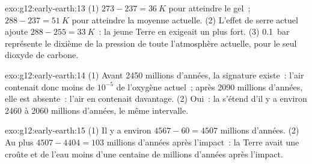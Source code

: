 \begin{solution}{exo:g12:early-earth:13}
(1) $273 - 237 = \qty{36}{K}$ pour atteindre le gel~; $288 - 237 = \qty{51}{K}$ pour
atteindre la moyenne actuelle. (2) L'effet de serre actuel ajoute $288 - 255 =
\qty{33}{K}$~: la jeune Terre en exigeait un plus fort. (3) \qty{0.1}{bar}
représente le dixième de la pression de toute l'atmosphère actuelle, pour
le seul dioxyde de carbone.
\end{solution}

\begin{solution}{exo:g12:early-earth:14}
(1) Avant 2450 millions d'années, la signature existe~: l'air contenait
donc moins de $10^{-5}$ de l'oxygène actuel~; après 2090 millions d'années,
elle est absente~: l'air en contenait davantage. (2) Oui~: la  s'étend d'il y a environ 2460 à 2060 millions d'années, le même
intervalle.
\end{solution}

\begin{solution}{exo:g12:early-earth:15}
(1) Il y a environ $4567 - 60 = 4507$ millions d'années. (2) Au plus $4507 - 4404 =
103$ millions d'années après l'impact~: la Terre avait une croûte et de
l'eau moins d'une centaine de millions d'années après l'impact.
\end{solution}

